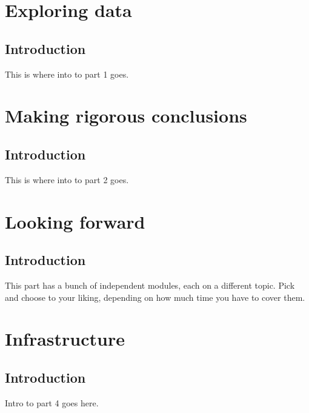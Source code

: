 \documentclass[]{book}
\theoremstyle{definition}
\theoremstyle{definition}
\theoremstyle{definition}
\theoremstyle{remark}
\begin{document}
\part{Exploring data}\label{part-exploring-data}

\chapter{Introduction}\label{explore-intro}

This is where into to part 1 goes.

\part{Making rigorous
conclusions}\label{part-making-rigorous-conclusions}

\chapter{Introduction}\label{rigor-intro}

This is where into to part 2 goes.

\part{Looking forward}\label{part-looking-forward}

\chapter{Introduction}\label{forward-intro}

This part has a bunch of independent modules, each on a different topic.
Pick and choose to your liking, depending on how much time you have to
cover them.

\part{Infrastructure}\label{part-infrastructure}

\chapter{Introduction}\label{infra-intro}

Intro to part 4 goes here.


\end{document}
